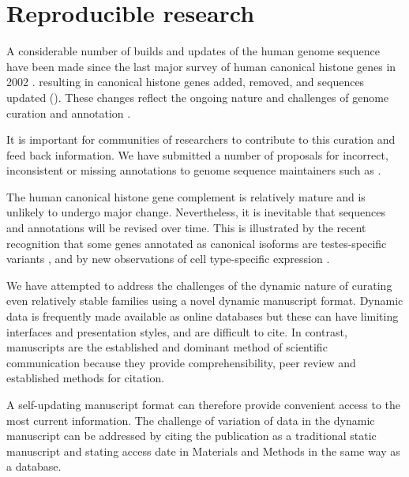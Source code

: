 \section{Reproducible research}
\label{sec:reproducible}

	A considerable number of builds and updates of the human genome sequence have been made 
	since the last major survey of human canonical histone genes in 2002 \citep{Marzluff02}.
	resulting in 
	 canonical histone genes added, 
	 removed, 
	and  sequences updated ().
	These changes reflect the ongoing nature and challenges of genome curation and annotation \citep{BorkKoonin1998}.

	It is important for communities of researchers 
	to contribute to this curation and feed back information. 
	We have submitted a number of proposals 
	for incorrect, inconsistent or missing annotations
	to genome sequence maintainers such as . 

	The human canonical histone gene complement is relatively mature and is unlikely to undergo major change.
	Nevertheless, it is inevitable that sequences and annotations will be revised over time. 
	This is illustrated by the recent recognition that 
	some genes annotated as canonical isoforms are testes-specific variants \citep{Talbert2012}, 
	and by new observations of cell type-specific expression \citep{Molden2015}. 

	We have attempted to address the challenges of the dynamic nature of curating 
	even relatively stable families using a novel dynamic manuscript format.
	Dynamic data is frequently made available as online databases
	but these can have limiting interfaces and presentation styles, and are difficult to cite.
	In contrast, manuscripts are the established and dominant method of scientific communication
	because they provide comprehensibility, peer review and established methods for citation.

	A self-updating manuscript format can therefore provide 
	convenient access to the most current information.
	The challenge of variation of data in the dynamic manuscript can be addressed 
	by citing the publication as a traditional static manuscript 
	and stating access date in Materials and Methods in the same way as a database.


